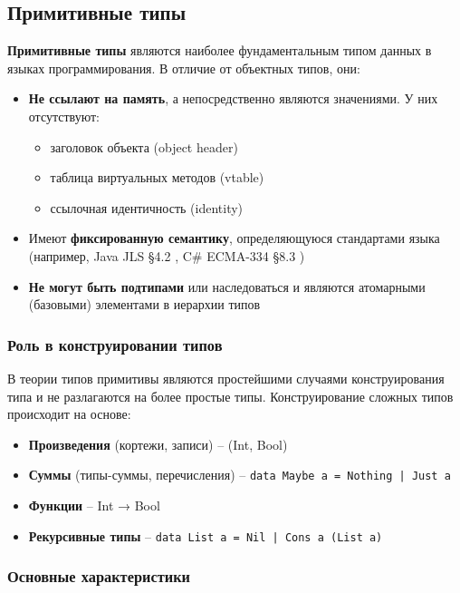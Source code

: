 \subsection{Примитивные типы}

\textbf{Примитивные типы} являются наиболее фундаментальным типом данных в языках программирования. В отличие от объектных типов, они:

\begin{itemize}
    \item \textbf{Не ссылают на память}, а непосредственно являются значениями. У них отсутствуют:
    \begin{itemize}
        \item заголовок объекта (object header)
        \item таблица виртуальных методов (vtable)
        \item ссылочная идентичность (identity)
    \end{itemize}
    \item Имеют \textbf{фиксированную семантику}, определяющуюся стандартами языка (например, Java JLS §4.2 \cite{java_spec}, C\# ECMA-334 §8.3 \cite{csharp_spec})

    \item \textbf{Не могут быть подтипами} или наследоваться и являются атомарными (базовыми) элементами в иерархии типов
\end{itemize}

\subsubsection{Роль в конструировании типов}
В теории типов примитивы являются простейшими случаями конструирования типа и не разлагаются на более простые типы. Конструирование сложных типов происходит на основе:

\begin{itemize}
    \item \textbf{Произведения} (кортежи, записи) -- (Int, Bool)
    \item \textbf{Суммы} (типы-суммы, перечисления) -- \texttt{data Maybe a = Nothing | Just a}
    \item \textbf{Функции} -- Int → Bool
    \item \textbf{Рекурсивные типы} -- \texttt{data List a = Nil | Cons a (List a)}
\end{itemize}

\subsubsection{Основные характеристики}

